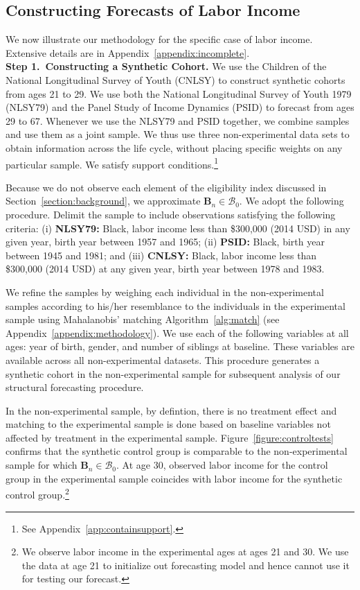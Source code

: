\subsection{Constructing Forecasts of Labor Income}

We now illustrate our methodology for the specific case of labor income. Extensive details are in Appendix~\ref{appendix:incomplete}.\\

\noindent \textbf{Step 1.\ Constructing a Synthetic Cohort.} We use the Children of the National Longitudinal Survey of Youth (CNLSY) to construct synthetic cohorts from ages 21 to 29. We use both the National Longitudinal Survey of Youth 1979 (NLSY79) and the Panel Study of Income Dynamics (PSID) to forecast from ages 29 to 67. Whenever we use the NLSY79 and PSID together, we combine samples and use them as a joint sample. We thus use three non-experimental data sets to obtain information across the life cycle, without placing specific weights on any particular sample. We satisfy support conditions.\footnote{See Appendix~\ref{app:containsupport}.}

Because we do not observe each element of the eligibility index discussed in Section~\ref{section:background}, we approximate $\bm{B}_{n} \in \mathcal{B}_0$. We adopt the following procedure. Delimit the sample to include observations satisfying the following criteria: (i) \textbf{NLSY79:} Black, labor income less than \$300,000 (2014 USD) in any given year, birth year between 1957 and 1965; (ii) \textbf{PSID:} Black, birth year between 1945 and 1981; and (iii) \textbf{CNLSY:} Black, labor income less than \$300,000 (2014 USD) at any given year, birth year between 1978 and 1983.

We refine the samples by weighing each individual in the non-experimental samples according to his/her resemblance to the individuals in the experimental sample using Mahalanobis' matching Algorithm~\ref{alg:match} (see Appendix~\ref{appendix:methodology}). We use each of the following variables at all ages: year of birth, gender, and number of siblings at baseline. These variables are available across all non-experimental datasets. This procedure generates a synthetic cohort in the non-experimental sample for subsequent analysis of our structural forecasting procedure.

In the non-experimental sample, by defintion, there is no treatment effect and matching to the experimental sample is done based on baseline variables not affected by treatment in the experimental sample. Figure~\ref{figure:controltests} confirms that the synthetic control group is comparable to the non-experimental sample for which $\bm{B}_{n} \in \mathcal{B}_0$. At age 30, observed labor income for the control group in the experimental sample coincides with labor income for the synthetic control group.\footnote{We observe labor income in the experimental ages at ages 21 and 30. We use the data at age 21 to initialize out forecasting model and hence cannot use it for testing our forecast.}

